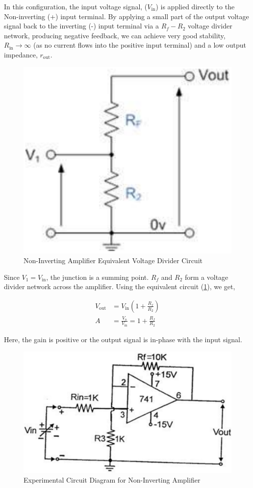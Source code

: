 In this configuration, the input voltage signal, ($V_\text{in}$) is applied directly to the Non-inverting (+) input terminal. By applying a small part of the output voltage signal back to the inverting (-) input terminal via a $R_f - R_2$ voltage divider network, producing negative feedback, we can achieve very good stability, $R_\text{in} \rightarrow \infty$ (as no current flows into the positive input terminal) and a low output impedance, $r_\text{out}$.

\begin{figure}[H]
    \centering
    \includegraphics[width=0.45\columnwidth]{images/noninv2.png}
    \caption{Non-Inverting Amplifier Equivalent Voltage Divider Circuit}
    \label{noninv2}
\end{figure}

Since $V_1 = V_\text{in}$, the junction is a  summing point. $R_f$ and $R_2$ form a voltage divider network across the amplifier. Using the equivalent circuit (\ref{noninv2}), we get,

\begin{align}
    V_\text{out} &= V_\text{in} \left(1+\frac{R_f}{R_2}\right) \nonumber\\
    A &= \frac{V_\text{o}}{V_\text{in}} = 1 + \frac{R_f}{R_2}
\end{align}

Here, the gain is positive or the output signal is in-phase with the input signal.

\begin{figure}[H]
    \centering
    \includegraphics[width=0.8\columnwidth]{images/noninv3.png}
    \caption{Experimental Circuit Diagram for Non-Inverting Amplifier}
    \label{noninv3}
\end{figure}

